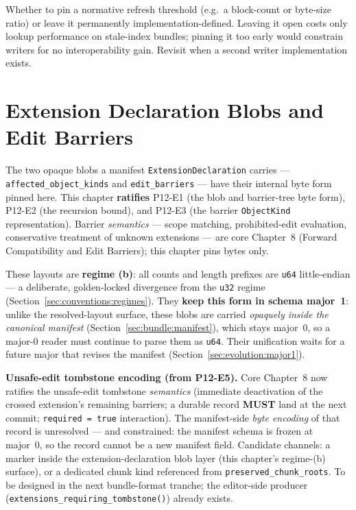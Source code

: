 \documentclass[11pt,letterpaper]{report}
\newcommand{\sectionsc}[1]{{\addfontfeatures{Letters=SmallCaps}#1}}
\newcommand{\MUST}{\textbf{MUST}}
\begin{document}
\begin{openquestion}
Whether to pin a normative refresh threshold (e.g.\ a block-count or
byte-size ratio) or leave it permanently implementation-defined. Leaving it
open costs only lookup performance on stale-index bundles; pinning it too
early would constrain writers for no interoperability gain. Revisit when a
second writer implementation exists.
\end{openquestion}

\chapter{Extension Declaration Blobs and Edit Barriers}
\label{ch:barriers}

The two opaque blobs a manifest \texttt{ExtensionDeclaration} carries ---
\texttt{affected\_object\_kinds} and \texttt{edit\_barriers} --- have their
internal byte form pinned here. This chapter \textbf{ratifies} P12-E1
(the blob and barrier-tree byte form), P12-E2 (the recursion bound), and
P12-E3 (the barrier \texttt{ObjectKind} representation). Barrier
\emph{semantics} --- scope matching, prohibited-edit evaluation,
conservative treatment of unknown extensions --- are core Chapter~8
(\sectionsc{Forward Compatibility and Edit Barriers}); this chapter pins
bytes only.

These layouts are \textbf{regime (b)}: all counts and length prefixes are
\texttt{u64} little-endian --- a deliberate, golden-locked divergence from the
\texttt{u32} regime (Section~\ref{sec:conventions:regimes}). They \textbf{keep
this form in schema major~1}: unlike the resolved-layout surface, these blobs
are carried \emph{opaquely inside the canonical manifest}
(Section~\ref{sec:bundle:manifest}), which stays major~0, so a major-0 reader
must continue to parse them as \texttt{u64}. Their unification waits for a
future major that revises the manifest (Section~\ref{sec:evolution:major1}).

\begin{openquestion}
\textbf{Unsafe-edit tombstone encoding (from P12-E5).} Core Chapter~8 now
ratifies the unsafe-edit tombstone \emph{semantics} (immediate deactivation of
the crossed extension's remaining barriers; a durable record \MUST{} land at
the next commit; \texttt{required = true} interaction). The manifest-side
\emph{byte encoding} of that record is unresolved --- and constrained: the
manifest schema is frozen at major~0, so the record cannot be a new manifest
field. Candidate channels: a marker inside the extension-declaration blob
layer (this chapter's regime-(b) surface), or a dedicated chunk kind
referenced from \texttt{preserved\_chunk\_roots}. To be designed in the next
bundle-format tranche; the editor-side producer
(\texttt{extensions\_requiring\_tombstone()}) already exists.
\end{openquestion}
\end{document}

